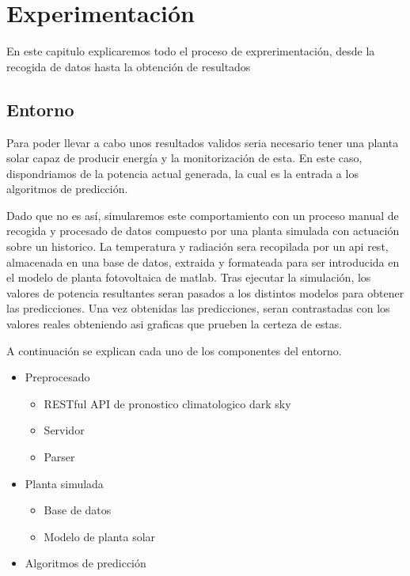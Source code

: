 \chapter{Experimentación}

\graphicspath{ {./graphs/} }

En este capitulo explicaremos todo el proceso de exprerimentación, desde la recogida de datos hasta la obtención de resultados


\section{Entorno}
Para poder llevar a cabo unos resultados validos seria necesario tener una planta solar capaz de producir energía y la monitorización de esta. En este caso, dispondriamos de la potencia actual generada, la cual es la entrada a los algoritmos de predicción. 

Dado que no es así, simularemos este comportamiento con un proceso manual de recogida y procesado de datos compuesto por una planta simulada con actuación sobre un historico.
La temperatura y radiación sera recopilada por un api rest, almacenada en una base de datos, extraida y formateada para ser introducida en el modelo de planta fotovoltaica de matlab.
Tras ejecutar la simulación, los valores de potencia resultantes seran pasados a los distintos modelos para obtener las predicciones.
Una vez obtenidas las predicciones, seran contrastadas con los valores reales obteniendo asi graficas que prueben la certeza de estas.

A continuación se explican cada uno de los componentes del entorno.

\begin{itemize}
    \item Preprocesado
    \begin{itemize}
        \item RESTful API de pronostico climatologico dark sky
        \item Servidor
        \item Parser
    \end{itemize}
    \item Planta simulada
    \begin{itemize}
        \item Base de datos
        \item Modelo de planta solar
    \end{itemize}
    \item Algoritmos de predicción
\end{itemize}


